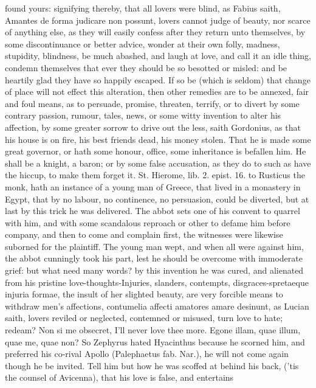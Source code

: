 {found yours: signifying thereby, that all lovers were blind, as Fabius
saith, Amantes de forma judicare non possunt, lovers cannot judge of
beauty, nor scarce of anything else, as they will easily confess after
they return unto themselves, by some discontinuance or better advice,
wonder at their own folly, madness, stupidity, blindness, be much
abashed, and laugh at love, and call it an idle thing, condemn
themselves that ever they should be so besotted or misled: and be
heartily glad they have so happily escaped.
If so be (which is seldom) that change of place will not effect this
alteration, then other remedies are to be annexed, fair and foul means,
as to persuade, promise, threaten, terrify, or to divert by some
contrary passion, rumour, tales, news, or some witty invention to alter
his affection, by some greater sorrow to drive out the less,
saith Gordonius, as that his house is on fire, his best friends dead,
his money stolen. That he is made some great governor, or hath
some honour, office, some inheritance is befallen him. He shall be a
knight, a baron; or by some false accusation, as they do to such as
have the hiccup, to make them forget it. St. Hierome, lib. 2. epist.
16. to Rusticus the monk, hath an instance of a young man of Greece,
that lived in a monastery in Egypt, that by no labour, no
continence, no persuasion, could be diverted, but at last by this trick
he was delivered. The abbot sets one of his convent to quarrel with
him, and with some scandalous reproach or other to defame him before
company, and then to come and complain first, the witnesses were
likewise suborned for the plaintiff. The young man wept, and when all
were against him, the abbot cunningly took his part, lest he should be
overcome with immoderate grief: but what need many words? by this
invention he was cured, and alienated from his pristine
love-thoughts-Injuries, slanders, contempts, disgraces-spretaeque
injuria formae, the insult of her slighted beauty, are very forcible
means to withdraw men's affections, contumelia affecti amatores amare
desinunt, as Lucian saith, lovers reviled or neglected, contemned
or misused, turn love to hate; redeam? Non si me obsecret, I'll
never love thee more. Egone illam, quae illum, quae me, quae non? So
Zephyrus hated Hyacinthus because he scorned him, and preferred his
co-rival Apollo (Palephaetus fab. Nar.), he will not come again though
he be invited. Tell him but how he was scoffed at behind his back,
('tis the counsel of Avicenna), that his love is false, and entertains
}
